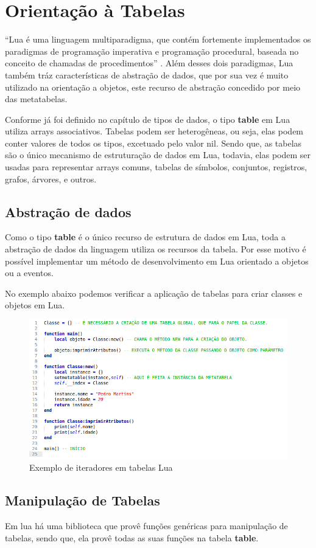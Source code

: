 \documentclass[
12pt, %
openright, %
oneside, %
a4paper, %
english, %
brazil, %
]{abntex2}
\begin{document}
\chapter{Orientação à Tabelas}
``Lua é uma linguagem multiparadigma, que contém fortemente implementados os paradigmas de programação imperativa e programação procedural, baseada no conceito de chamadas de procedimentos'' \cite{language_Lua}. Além desses dois paradigmas, Lua também tráz características de abstração de dados, que por sua vez é muito utilizado na orientação a objetos, este recurso de abstração concedido por meio das metatabelas.

Conforme já foi definido no capítulo de tipos de dados, o tipo \textbf{table} em Lua utiliza arrays associativos. Tabelas podem ser heterogêneas, ou seja, elas podem conter valores de todos os tipos, excetuado pelo valor nil. Sendo que, as tabelas são o único mecanismo de estruturação de dados em Lua, todavia, elas podem ser usadas para representar arrays comuns, tabelas de símbolos, conjuntos, registros, grafos, árvores, e outros.

\section{Abstração de dados}
Como o tipo \textbf{table} é o único recurso de estrutura de dados em Lua, toda a abstração de dados da linguagem utiliza os recursos da tabela. Por esse motivo é possível implementar um método de desenvolvimento em Lua orientado a objetos ou a eventos.

No exemplo abaixo podemos verificar a aplicação de tabelas para criar classes e objetos em Lua.

\begin{figure}[H]
\centering
\includegraphics[width=0.8\linewidth]{imagens/OO.png}
\caption{Exemplo de iteradores em tabelas Lua}
\end{figure}

\section{Manipulação de Tabelas}
Em lua há uma biblioteca que provê funções genéricas para manipulação de tabelas, sendo que, ela provê todas as suas funções na tabela \textbf{table}.
\end{document}
